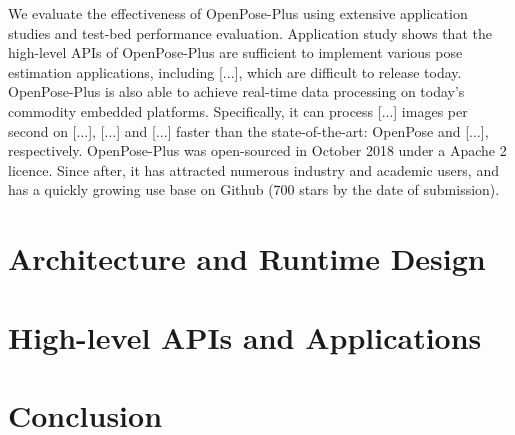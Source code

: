 \documentclass[twoside,11pt]{article}
\begin{document}
We evaluate the effectiveness of OpenPose-Plus 
using extensive application studies and
test-bed performance evaluation. 
Application study shows that the high-level APIs of OpenPose-Plus
are sufficient to implement various pose estimation
applications, including [...], which are difficult to release today.
OpenPose-Plus is also able to achieve real-time data processing
on today's commodity embedded platforms. Specifically, it can
process [...] images per second on [...], [...] and [...] faster
than the state-of-the-art: OpenPose and [...], respectively. 
OpenPose-Plus was open-sourced in October 2018 under a 
Apache 2 licence. Since after, it has attracted numerous 
industry and academic users, and has a quickly growing use base on Github (700 stars by the date of submission). 

\section{Architecture and Runtime Design}

\section{High-level APIs and Applications}

\section{Conclusion}




\end{document}
